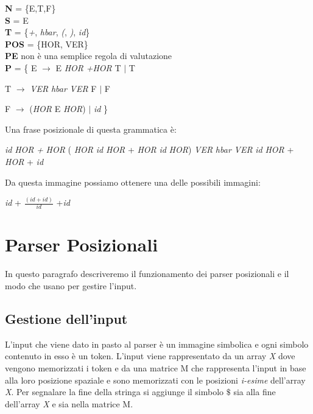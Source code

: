 \begin{center}
	\textbf{N} = \{E,T,F\} \\
	\textbf{S} = E  \\
	\textbf{T} =  \{\textit{+}, \textit{hbar}, \textit{(}, \textit{)}, \textit{id}\} \\
	\textbf{POS}  = \{HOR, VER\}\\
	\textbf{PE} non è una semplice regola di valutazione\\
	\textbf{P}   = \{ E $\to$ E \textit{HOR} \textit{+}\textit{HOR} T $\mid$ T \par 
	         \hspace{1.1cm}T $\to$ \textit{VER} \textit{hbar} \textit{VER} F $\mid$ F \par 
	         \hspace{1.1cm} F $\to$ (\textit{HOR} E \textit{HOR}) $\mid$ \textit{id}  \}   
\end{center}
Una frase posizionale di questa grammatica è:
\begin{center}
	\textit{id} \textit{HOR} \textit{+} \textit{HOR} ( \textit{HOR} \textit{id} \textit{HOR} + \textit{HOR} \textit{id} \textit{HOR}) \textit{VER} \textit{hbar} \textit{VER} \textit{id} \textit{HOR} + \textit{HOR} + \textit{id}
\end{center}
Da questa immagine possiamo ottenere una delle possibili immagini:
\begin{center}
	 \textit{id} + $\frac{(\textit{id} + \textit{id})}{\textit{id}}$ +\textit{id}
\end{center}
\section{Parser Posizionali}
In questo paragrafo descriveremo il funzionamento dei parser posizionali e il modo che usano per gestire l'input.
\subsection{Gestione dell'input}
L'input che viene dato in pasto al parser è un immagine simbolica e ogni simbolo contenuto in esso è un token. L'input viene rappresentato da un array \textit{X} dove vengono memorizzati i token e da una matrice M che rappresenta l'input in base alla loro posizione spaziale e sono memorizzati con le posizioni \textit{i-esime} dell'array \textit{X}. Per segnalare la fine della stringa si aggiunge il simbolo $\$$ sia alla fine dell'array \textit{X} e sia nella matrice M.
